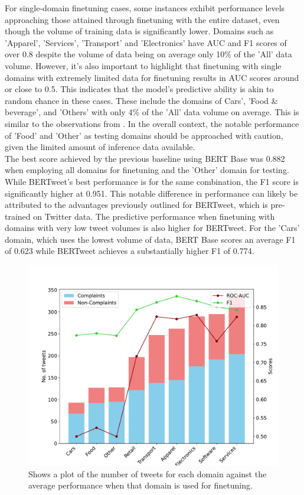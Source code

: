 For single-domain finetuning cases, some instances exhibit performance levels approaching those attained through finetuning with the entire dataset, even though the volume of training data is significantly lower. Domains such as 'Apparel', 'Services', 'Transport' and 'Electronics' have AUC and F1 scores of over 0.8 despite the volume of data being on average only 10\% of the 'All' data volume. However, it's also important to highlight that finetuning with single domains with extremely limited data for finetuning results in AUC scores around or close to 0.5. This indicates that the model's predictive ability is akin to random chance in these cases. These include the domains of Cars', 'Food \& beverage', and 'Others' with only 4\% of the 'All' data volume on average. This is similar to the observations from \cite{jin_complaint_2020}. In the overall context, the notable performance of  'Food' and 'Other' as testing domains should be approached with caution, given the limited amount of inference data available.\\

The best score achieved by the previous baseline \cite{jin_complaint_2020} using BERT Base was 0.882 when employing all domains for finetuning and the 'Other' domain for testing. While BERTweet's best performance is for the same combination, the F1 score is significantly higher at 0.951. This notable difference in performance can likely be attributed to the advantages previously outlined for BERTweet, which is pre-trained on Twitter data. The predictive performance when finetuning with domains with very low tweet volumes is also higher for BERTweet. For the 'Cars' domain, which uses the lowest volume of data, BERT Base scores an average F1 of 0.623 while BERTweet achieves a substantially higher F1 of 0.774.\\

\begin{figure}[htb]
    \centering
    \captionsetup{font=small}
    \includegraphics[width=12cm]{figures/cross_domain_instancevsmetric.pdf}
    \vspace*{-3mm}
    \caption{Shows a plot of the number of tweets for each domain against the average performance when that domain is used for finetuning.}
    \label{fig: cross_domain_train_domain}
\end{figure}

